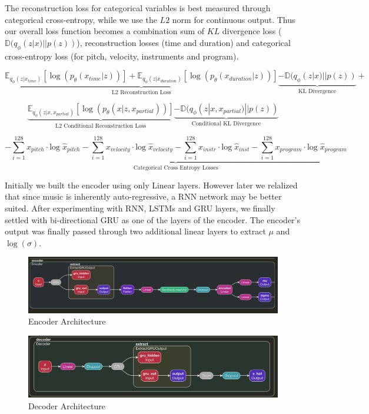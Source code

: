 \documentclass{article}
\begin{document}
The reconstruction loss for categorical variables is best measured through categorical cross-entropy, while we use the $L2$ norm for continuous output. Thus our overall loss function becomes a combination sum of $KL$ divergence loss ($\mathbb{D}(q_{\phi}(z|x) || p(z))$), reconstruction losses (time and duration) and categorical cross-entropy loss (for pitch, velocity, instruments and program). 

$$ \underbrace{\mathbb{E}_{q_{\phi}(z|x_{time})} [ \log(p_{\theta}(x_{time}|z))] + \mathbb{E}_{q_{\phi}(z|x_{duration})} [ \log(p_{\theta}(x_{duration}|z))]}_{\text{L2 Reconstruction Loss}}  \underbrace{- \mathbb{D}(q_{\phi}(z|x) || p(z)) }_{\text{KL Divergence}} + $$ 

$$ \underbrace{ \mathbb{E}_{q_{\phi}(z|x,x_{partial})} [ \log(p_{\theta}(x|z, x_{partial}))]}_{\text{L2 Conditional Reconstruction Loss}} \underbrace{-\mathbb{D}(q_{\phi}(z|x, x_{partial}) || p(z))}_{\text{Conditional KL Divergence}} $$


$$ \underbrace{-\sum_{i=1}^{128} x_{pitch} \cdot \mathrm{log}\; {\hat{x}}_{pitch}  - \sum_{i=1}^{128} x_{velocity} \cdot \mathrm{log}\; {\hat{x}}_{velocity} - \sum_{i=1}^{128} x_{instr} \cdot \mathrm{log}\; {\hat{x}}_{inst} -\sum_{i=1}^{128} x_{program} \cdot \mathrm{log}\; {\hat{x}}_{program}}_{\text{Categorical Cross Entropy Losses}} $$

Initially we built the encoder using only Linear layers. However later we relalized that since music is inherently auto-regressive, a RNN network may be better suited. After experimenting with RNN, LSTMs and GRU layers, we finally settled with bi-directional GRU as one of the layers of the encoder. The encoder's output was finally passed through two additional linear layers to extract $\mu$ and $ \log(\sigma)$.

\begin{center}
\begin{figure}
\includegraphics[width=1.0\linewidth]{encoder.png}
\caption{Encoder Architecture}
\end{figure}
\end{center}

\begin{center}
\begin{figure}
\includegraphics[width=1.0\linewidth]{decoder.png}
\caption{Decoder Architecture}
\end{figure}
\end{center}
\end{document}
